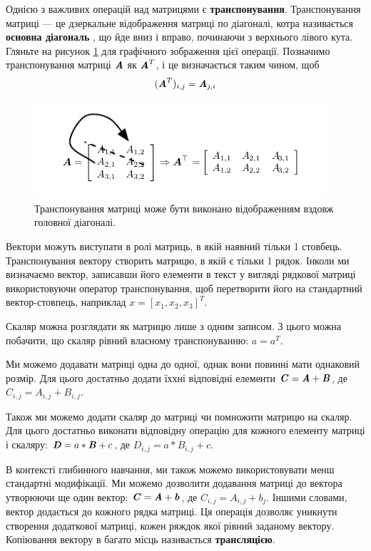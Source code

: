 Однією з важливих операцій над матрицями є \textbf{транспонування}. Транспонування матриці — це дзеркальне відображення матриці по діагоналі, котра називається
\textbf{основна діагональ} , що йде вниз і вправо, починаючи з верхнього лівого кута. Гляньте на рисунок \ref{fig:transpose} для графічного зображення цієї операції. Позначимо транспонування матриці $\textbf{\textit{A}}$ як $\textbf{\textit{A}}^T$, і це визначається таким чином, щоб
\begin{equation}
(\textbf{\textit{A}}^T)_{i,j} = \textbf{\textit{A}}_{j,i}
\end{equation}

\begin{figure}
\centering
\includegraphics{transpose.png}
\caption{Транспонування матриці може бути виконано відображенням вздовж головної діагоналі.}
\label{fig:transpose}
\end{figure}

Вектори можуть виступати в ролі матриць, в якій наявний тільки 1 стовбець. Транспонування вектору створить матрицю, в якій є тільки 1 рядок. Інколи ми визначаємо вектор, записавши його елементи в текст у вигляді рядкової матриці
використовуючи оператор транспонування, щоб перетворити його на стандартний вектор-стовпець, наприклад $x = [x_1, x_2, x_3]^T$.

Скаляр можна розглядати як матрицю лише з одним записом. З цього можна побачити, що скаляр рівний власному транспонуванню: $a = a^T$.

Ми можемо додавати матриці одна до одної, однак вони повинні мати однаковий розмір. Для цього достатньо додати їххні відповідні елементи $\textbf{\textit{C}} = \textbf{\textit{A}} + \textbf{\textit{B}}$, де $\textit{C}_{i,j} = \textit{A}_{i,j} + \textit{B}_{i,j}$.

Також ми можемо додати скаляр до матриці чи помножити матрицю на скаляр. Для цього достатньо виконати відповідну операцію для кожного елементу матриці і скаляру: $\textbf{\textit{D}} = a * \textbf{\textit{B}} + c$, де $\textit{D}_{i,j} = a * \textit{B}_{i,j} + c$.

В контексті глибинного навчання, ми також можемо використовувати менш стандартні модифікації. Ми можемо дозволити додавання матриці до вектора утворюючи ще один вектор: $\textbf{\textit{C}} = \textbf{\textit{A}} + \textbf{\textit{b}}$, де $\textit{C}_{i,j} = \textit{A}_{i,j} + \textit{b}_{j}$. Іншими словами, вектор додається до кожного рядка матриці. Ця операція дозволяє уникнути створення додаткової матриці, кожен ряждок якої рівний заданому вектору. Копіювання вектору в багато місць називається \textbf{трансляцією}.

